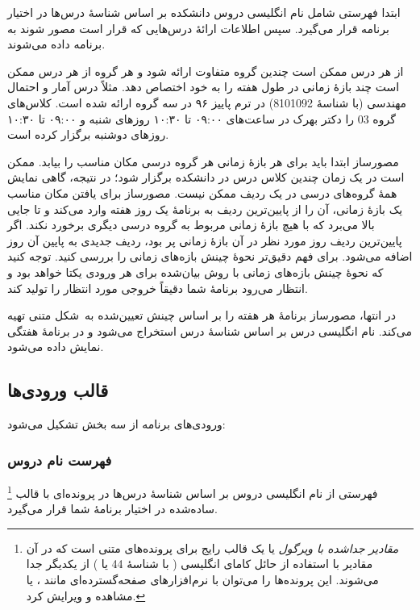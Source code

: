 \documentclass{utap}
\begin{document}
    ابتدا فهرستی شامل نام انگلیسی دروس دانشکده بر اساس شناسهٔ درس‌ها در اختیار برنامه قرار می‌گیرد. سپس اطلاعات ارائهٔ درس‌هایی که قرار است مصور شوند به برنامه داده می‌شوند.

    از هر درس ممکن است چندین گروه متفاوت ارائه شود و هر گروه از هر درس ممکن است چند بازهٔ زمانی در طول هفته را به خود اختصاص دهد. مثلاً درس آمار و احتمال مهندسی (با شناسهٔ 8101092) در ترم پاییز ۹۶ در سه گروه ارائه شده است. کلاس‌های گروه 03 را دکتر بهرک در ساعت‌های ۰۹:۰۰ تا ۱۰:۳۰ روزهای شنبه و ۰۹:۰۰ تا ۱۰:۳۰ روزهای دوشنبه برگزار کرده است.

    مصورساز ابتدا باید برای هر بازهٔ زمانی هر گروه درسی مکان مناسب را بیابد. ممکن است در یک زمان چندین کلاس درس در دانشکده برگزار شود؛ در نتیجه، گاهی نمایش همهٔ گروه‌های درسی در یک ردیف ممکن نیست. مصورساز برای یافتن مکان مناسب یک بازهٔ زمانی، آن را از پایین‌ترین ردیف به برنامهٔ یک روز هفته وارد می‌کند و تا جایی بالا می‌برد که با هیچ بازهٔ زمانی مربوط به گروه درسی دیگری برخورد نکند. اگر پایین‌ترین ردیف روز مورد نظر در آن بازهٔ زمانی پر بود، ردیف جدیدی به پایین آن روز اضافه می‌شود. برای فهم دقیق‌تر نحوهٔ چینش بازه‌‌های زمانی  را بررسی کنید. توجه کنید که نحوهٔ چینش بازه‌های زمانی با روش بیان‌شده برای هر ورودی یکتا خواهد بود و انتظار می‌رود برنامهٔ شما دقیقاً خروجی مورد انتظار را تولید کند.

    در انتها، مصورساز برنامهٔ هر هفته را بر اساس چینش تعیین‌شده به~شکل متنی تهیه می‌کند. نام انگلیسی درس بر اساس شناسهٔ درس استخراج می‌شود و در برنامهٔ هفتگی نمایش داده می‌شود.

    \subsection{قالب ورودی‌ها}

    ورودی‌های برنامه از سه بخش تشکیل می‌شود:

    \subsubsection{فهرست نام دروس}

    فهرستی از نام انگلیسی دروس بر اساس شناسهٔ  درس‌ها در پرونده‌ای با قالب \footnote{\textit{مقادیر جداشده با ویرگول} یا  یک قالب رایج برای پرونده‌های متنی است که در آن مقادیر با استفاده از حائل کامای انگلیسی (\lr{\texttt{,}} با شناسهٔ  44 یا ) از یکدیگر جدا می‌شوند. این پرونده‌ها را می‌توان با نرم‌افزارهای صفحه‌گسترده‌ای مانند ،  یا  مشاهده و ویرایش کرد.} ساده‌شده در اختیار برنامهٔ شما قرار می‌گیرد.
\end{document}
